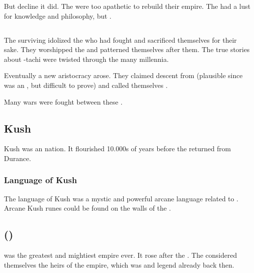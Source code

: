But decline it did.
The \quiljaaran were too apathetic to rebuild their empire. 
The \quiljaaran had a lust for knowledge and philosophy, but . 









\subsection{\Dragonkings}
The surviving \ophidians idolized the \dragons who had fought and sacrificed themselves for their sake. 
They worshipped the \dragons and patterned themselves after them. 
The true stories about \Sethicus-tachi were twisted through the many millennia. 

Eventually a new aristocracy arose. 
They claimed descent from \Sethicus (plausible since \Sethicus was an \ophidian, but difficult to prove) and called themselves \quo{\dragonkings}. 

Many wars were fought between these \dragonkings. 









\subsection{Kush}
Kush was an \ophidian nation. 
It flourished 10.000s of years before the \dragons returned from Durance. 





\subsubsection{Language of Kush}
The language of Kush was a mystic and powerful arcane language related to . 
Arcane Kush runes could be found on the walls of the . 









\subsection{\Saphyrae ()}
\index{\Saphyrae}
\Saphyrae{} was the greatest and mightiest \quiljaaran{} empire ever. 
It rose after the \firstbanewar. 
The \Saphyraeans{} considered themselves the heirs of the \ophidian{} empire, which was  and legend already back then. 

